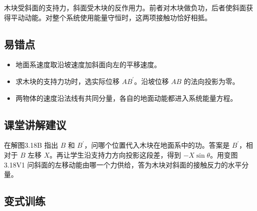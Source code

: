 \documentclass[UTF8,fontset=fandol,a4paper,11pt]{ctexart}
\begin{document}
木块受斜面的支持力，斜面受木块的反作用力。前者对木块做负功，后者使斜面获得平动动能。对整个系统使用能量守恒时，这两项接触功恰好相抵。



\subsection*{易错点}

\begin{itemize}
\item 地面系速度取沿坡速度加斜面向左的平移速度。
\item 求木块的支持力功时，选实际位移 $AB^{\prime}$。沿坡位移 $AB$ 的法向投影为零。
\item 两物体的速度沿法线有共同分量，各自的地面动能都进入系统能量方程。
\end{itemize}



\subsection*{课堂讲解建议}

在解图3.18B 指出 $B$ 和 $B^{\prime}$，问哪个位置代入木块在地面系中的功。答案是 $B^{\prime}$，相对于 $B$ 左移 $X$。再让学生沿支持力方向投影这段差，得到 $-X\sin\theta$。用变图3.18V1 问斜面的左移动能由哪一个力供给，答为木块对斜面的接触反力的水平分量。



\subsection*{变式训练}
\end{document}
